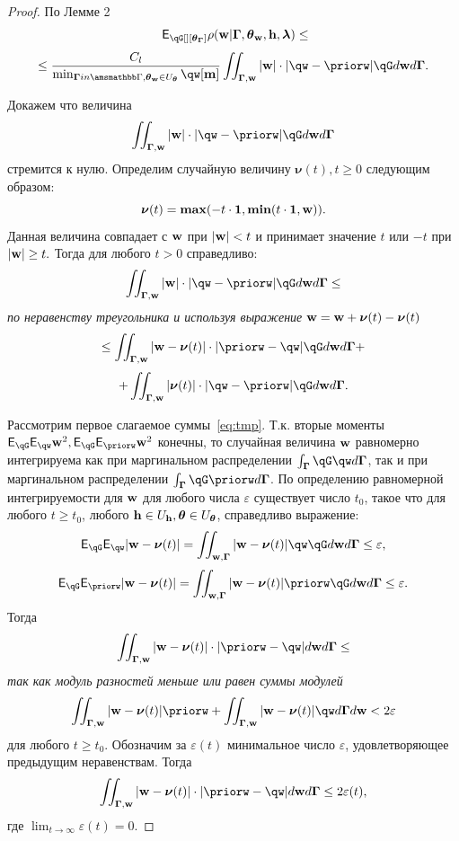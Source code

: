 \begin{proof}

По Лемме 2
\[
    \E_{\qG[][{\tetaG}]} {\rho}(\w|\G, {\tetaw}, {\h}, \lam)  \leq
\]
\[
\leq  \frac{C_l}{\min_{\G in \Gb, \tetaw \in \Uteta} \qw[\mathbf{m}]}  \iint_{\G,\w} |\w| \cdot |\qw - \priorw|\qG d\w d\G.
\]

Докажем что величина
\[
    \iint_{\G,\w} |\w| \cdot |\qw - \priorw|\qG d\w d\G
\]
стремится к нулю.
Определим случайную величину $\boldsymbol{\nu}(t), t \geq 0$ следующим образом:
\[
    \boldsymbol{\nu}(t) = \boldsymbol{\max}(-t \cdot \mathbf{1}, \boldsymbol{\min}(t \cdot \mathbf{1}, \mathbf{w})).
\]
Данная величина совпадает с $\mathbf{w}$ при $|\mathbf{w}| < t$ и принимает значение $t$ или $-t$ при $|\mathbf{w}| \geq t.$
Тогда для любого $t>0$ справедливо:
\[
    \iint_{\G,\w} |\w| \cdot |\qw - \priorw|\qG d\w d\G \leq
\]
\textit{по неравенству треугольника и используя выражение }$\mathbf{w} = \mathbf{w} + \boldsymbol{\nu}(t) -\boldsymbol{\nu}(t)$
\begin{equation}
\label{eq:tmp}
    \leq    \iint_{\G,\w} |\w -\boldsymbol{\nu}(t)| \cdot |\priorw -\qw|\qG d\w d\G   +
\end{equation}
\[ +      \iint_{\G,\w} |\boldsymbol{\nu}(t)| \cdot |\qw - \priorw|\qG d\w d\G.
\]




Рассмотрим первое слагаемое суммы~\eqref{eq:tmp}. Т.к. вторые моменты $\E_{\qG}\E_{\qw} \w^2, \E_{\qG}\E_{\priorw} \w^2$ конечны, то случайная величина $\mathbf{w}$ равномерно интегрируема как при маргинальном распределении $\int_{\G}\qG\qw d\G$, так и при маргинальном распределении $\int_{\G}\qG\priorw d\G$.
По определению равномерной интегрируемости для $\mathbf{w}$ для любого числа $\varepsilon$ существует число $t_0$, такое что для любого $t \geq t_0$, любого $\mathbf{h} \in U_{\mathbf{h}}, \boldsymbol{\theta} \in U_{\boldsymbol{\theta}}$,  справедливо выражение:
\[
    \E_{\qG}\E_{\qw}|\w - \boldsymbol{\nu}(t)| = \iint_{\w,\G}|\w - \boldsymbol{\nu}(t)|\qw\qG d\w d\G \leq \varepsilon,
\]
\[
    \E_{\qG}\E_{\priorw}|\w - \boldsymbol{\nu}(t)| = \iint_{\w,\G}|\w - \boldsymbol{\nu}(t)|\priorw\qG d\w d\G \leq \varepsilon.
\]
Тогда
\[
   \iint_{\G,\w} |\w -\boldsymbol{\nu}(t)|\cdot|\priorw  - \qw| d\w d\G   \leq  
\]
\textit{так как модуль разностей меньше или равен суммы модулей}
\[
  \iint_{\G,\w} |\w -\boldsymbol{\nu}(t)|\priorw  +   \iint_{\G,\w} |\w -\boldsymbol{\nu}(t)|\qw d\G d\w < 2 \varepsilon
\]
для любого $t \geq t_0$. Обозначим за $\varepsilon(t)$ минимальное число $\varepsilon$, удовлетворяющее предыдущим неравенствам. Тогда
$$
 \iint_{\G,\w} |\w -\boldsymbol{\nu}(t)|\cdot|\priorw  - \qw| d\w d\G  \leq 2 \varepsilon(t),
$$
где $\lim_{t \to \infty} \varepsilon(t) = 0$.


\end{proof}

